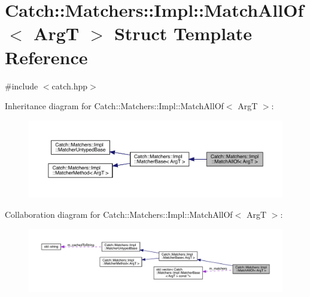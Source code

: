 \hypertarget{struct_catch_1_1_matchers_1_1_impl_1_1_match_all_of}{}\section{Catch\+:\+:Matchers\+:\+:Impl\+:\+:Match\+All\+Of$<$ ArgT $>$ Struct Template Reference}
\label{struct_catch_1_1_matchers_1_1_impl_1_1_match_all_of}


{\ttfamily \#include $<$catch.\+hpp$>$}



Inheritance diagram for Catch\+:\+:Matchers\+:\+:Impl\+:\+:Match\+All\+Of$<$ ArgT $>$\+:
\nopagebreak
\begin{figure}[H]
\begin{center}
\leavevmode
\includegraphics[width=350pt]{struct_catch_1_1_matchers_1_1_impl_1_1_match_all_of__inherit__graph}
\end{center}
\end{figure}


Collaboration diagram for Catch\+:\+:Matchers\+:\+:Impl\+:\+:Match\+All\+Of$<$ ArgT $>$\+:
\nopagebreak
\begin{figure}[H]
\begin{center}
\leavevmode
\includegraphics[width=350pt]{struct_catch_1_1_matchers_1_1_impl_1_1_match_all_of__coll__graph}
\end{center}
\end{figure}
